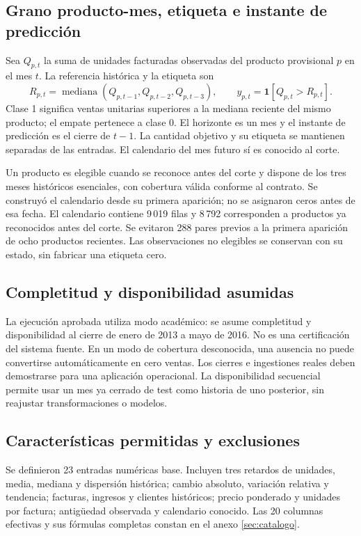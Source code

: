 \subsection{Grano producto-mes, etiqueta e instante de predicción}
Sea $Q_{p,t}$ la suma de unidades facturadas observadas del producto provisional $p$ en el mes $t$. La referencia histórica y la etiqueta son
\begin{equation}R_{p,t}=\operatorname{mediana}(Q_{p,t-1},Q_{p,t-2},Q_{p,t-3}),\qquad y_{p,t}=\mathbf1[Q_{p,t}>R_{p,t}].\label{eq:etiqueta}\end{equation}
Clase 1 significa ventas unitarias superiores a la mediana reciente del mismo producto; el empate pertenece a clase 0. El horizonte es un mes y el instante de predicción es el cierre de $t-1$. La cantidad objetivo y su etiqueta se mantienen separadas de las entradas. El calendario del mes futuro sí es conocido al corte.

Un producto es elegible cuando se reconoce antes del corte y dispone de los tres meses históricos esenciales, con cobertura válida conforme al contrato. Se construyó el calendario desde su primera aparición; no se asignaron ceros antes de esa fecha. El calendario contiene 9\,019 filas y 8\,792 corresponden a productos ya reconocidos antes del corte. Se evitaron 288 pares previos a la primera aparición de ocho productos recientes. Las observaciones no elegibles se conservan con su estado, sin fabricar una etiqueta cero.

\subsection{Completitud y disponibilidad asumidas}
La ejecución aprobada utiliza modo académico: se asume completitud y disponibilidad al cierre de enero de 2013 a mayo de 2016. No es una certificación del sistema fuente. En un modo de cobertura desconocida, una ausencia no puede convertirse automáticamente en cero ventas. Los cierres e ingestiones reales deben demostrarse para una aplicación operacional. La disponibilidad secuencial permite usar un mes ya cerrado de test como historia de uno posterior, sin reajustar transformaciones o modelos.

\subsection{Características permitidas y exclusiones}
Se definieron 23 entradas numéricas base. Incluyen tres retardos de unidades, media, mediana y dispersión histórica; cambio absoluto, variación relativa y tendencia; facturas, ingresos y clientes históricos; precio ponderado y unidades por factura; antigüedad observada y calendario conocido. Las 20 columnas efectivas y sus fórmulas completas constan en el anexo \ref{sec:catalogo}.


